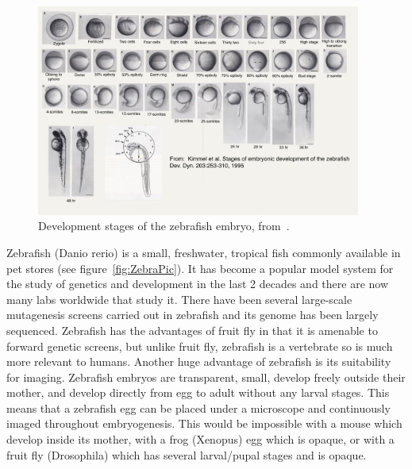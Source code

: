 \begin{figure}[htb]
\begin{center}
\leavevmode
 \includegraphics[width=0.95\textwidth]{pictures/zebrafishDev}
\end{center}
\caption{Development stages of the zebrafish embryo, from~\cite{kimmel1995stages}.}
\label{fig:zebradev}
\end{figure}

Zebrafish (Danio rerio) is a small, freshwater, tropical fish commonly available
in pet stores (see figure~\ref{fig:ZebraPic}). It has become a popular model system for the
study of genetics and development in the last 2 decades and there are now
many labs worldwide that study it. There have been several
large-scale mutagenesis screens carried out in zebrafish and its genome has been
largely sequenced. Zebrafish has the advantages of fruit fly in that it
is amenable to forward genetic screens, but unlike fruit fly, zebrafish is a
vertebrate so is much more relevant to humans. Another huge advantage
of zebrafish is its suitability for imaging. Zebrafish embryos are transparent,
small, develop freely outside their mother, and develop directly from egg to
adult without any larval stages. This means that a zebrafish egg can be placed
under a microscope and continuously imaged throughout embryogenesis. This would
be impossible with a mouse which develop inside its mother, with a frog
(Xenopus) egg which is opaque, or with a fruit fly (Drosophila) which has
several larval/pupal stages and is opaque.


